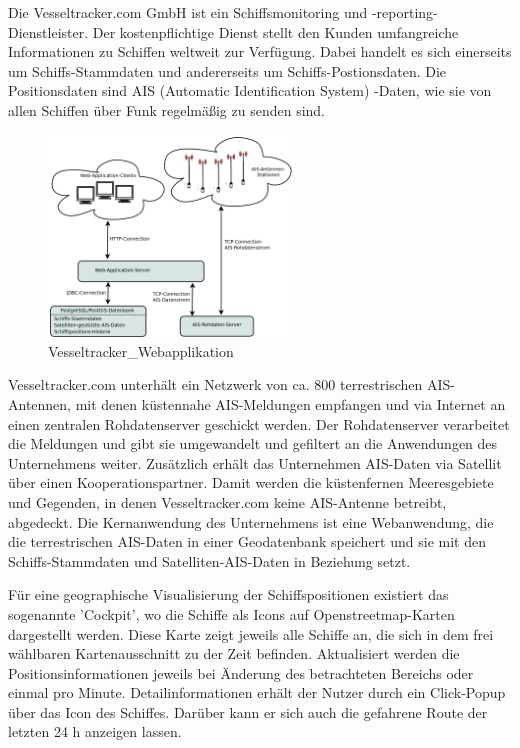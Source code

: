 Die Vesseltracker.com GmbH ist ein Schiffsmonitoring und -reporting-Dienstleister. Der kostenpflichtige Dienst stellt den Kunden umfangreiche Informationen zu Schiffen weltweit zur Verfügung. Dabei handelt es sich einerseits um Schiffs-Stammdaten und andererseits um Schiffs-Postionsdaten. Die Positionsdaten sind AIS (Automatic Identification System) -Daten, wie sie von allen Schiffen über Funk regelmäßig zu senden sind.

\begin{figure}
  \begin{center}
    \includegraphics[width=0.58\textwidth]{images/Exposee_graphik_Webapp}
  \end{center}
  \caption{Vesseltracker\_Webapplikation}
\end{figure}

Vesseltracker.com unterhält ein Netzwerk von ca. 800 terrestrischen AIS-Antennen, mit denen küstennahe AIS-Meldungen empfangen und via Internet an einen zentralen Rohdatenserver geschickt werden. Der Rohdatenserver verarbeitet die Meldungen und gibt sie umgewandelt und gefiltert an die Anwendungen des Unternehmens weiter.
Zusätzlich erhält das Unternehmen AIS-Daten via Satellit über einen Kooperationspartner. Damit werden die küstenfernen Meeresgebiete und Gegenden, in denen Vesseltracker.com keine AIS-Antenne betreibt, abgedeckt.
Die Kernanwendung des Unternehmens ist eine Webanwendung, die die terrestrischen AIS-Daten in einer Geodatenbank speichert und sie mit den Schiffs-Stammdaten und Satelliten-AIS-Daten in Beziehung setzt.

Für eine geographische Visualisierung der Schiffspositionen existiert das sogenannte 'Cockpit', wo die Schiffe als Icons auf Openstreetmap-Karten dargestellt werden. Diese Karte zeigt jeweils alle Schiffe an, die sich in dem frei wählbaren Kartenausschnitt zu der Zeit befinden. Aktualisiert werden die Positionsinformationen jeweils bei Änderung des betrachteten Bereichs oder einmal pro Minute. Detailinformationen erhält der Nutzer durch ein Click-Popup über das Icon des Schiffes. Darüber kann er sich auch die gefahrene Route der letzten 24 h anzeigen lassen.


